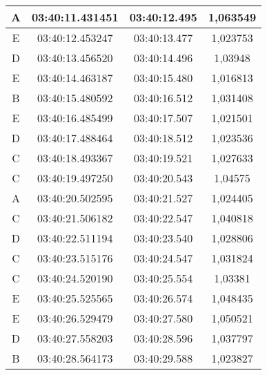 \begin{longtable}{|ccc|c|}
  \multicolumn{1}{|c|}{A}    & \multicolumn{1}{c|}{03:40:11.431451} & 03:40:12.495       & 1,063549   \\ \hline
  \multicolumn{1}{|c|}{E}    & \multicolumn{1}{c|}{03:40:12.453247} & 03:40:13.477       & 1,023753   \\ \hline
  \multicolumn{1}{|c|}{D}    & \multicolumn{1}{c|}{03:40:13.456520} & 03:40:14.496       & 1,03948    \\ \hline
  \multicolumn{1}{|c|}{E}    & \multicolumn{1}{c|}{03:40:14.463187} & 03:40:15.480       & 1,016813   \\ \hline
  \multicolumn{1}{|c|}{B}    & \multicolumn{1}{c|}{03:40:15.480592} & 03:40:16.512       & 1,031408   \\ \hline
  \multicolumn{1}{|c|}{E}    & \multicolumn{1}{c|}{03:40:16.485499} & 03:40:17.507       & 1,021501   \\ \hline
  \multicolumn{1}{|c|}{D}    & \multicolumn{1}{c|}{03:40:17.488464} & 03:40:18.512       & 1,023536   \\ \hline
  \multicolumn{1}{|c|}{C}    & \multicolumn{1}{c|}{03:40:18.493367} & 03:40:19.521       & 1,027633   \\ \hline
  \multicolumn{1}{|c|}{C}    & \multicolumn{1}{c|}{03:40:19.497250} & 03:40:20.543       & 1,04575    \\ \hline
  \multicolumn{1}{|c|}{A}    & \multicolumn{1}{c|}{03:40:20.502595} & 03:40:21.527       & 1,024405   \\ \hline
  \multicolumn{1}{|c|}{C}    & \multicolumn{1}{c|}{03:40:21.506182} & 03:40:22.547       & 1,040818   \\ \hline
  \multicolumn{1}{|c|}{D}    & \multicolumn{1}{c|}{03:40:22.511194} & 03:40:23.540       & 1,028806   \\ \hline
  \multicolumn{1}{|c|}{C}    & \multicolumn{1}{c|}{03:40:23.515176} & 03:40:24.547       & 1,031824   \\ \hline
  \multicolumn{1}{|c|}{C}    & \multicolumn{1}{c|}{03:40:24.520190} & 03:40:25.554       & 1,03381    \\ \hline
  \multicolumn{1}{|c|}{E}    & \multicolumn{1}{c|}{03:40:25.525565} & 03:40:26.574       & 1,048435   \\ \hline
  \multicolumn{1}{|c|}{E}    & \multicolumn{1}{c|}{03:40:26.529479} & 03:40:27.580       & 1,050521   \\ \hline
  \multicolumn{1}{|c|}{D}    & \multicolumn{1}{c|}{03:40:27.558203} & 03:40:28.596       & 1,037797   \\ \hline
  \multicolumn{1}{|c|}{B}    & \multicolumn{1}{c|}{03:40:28.564173} & 03:40:29.588       & 1,023827   \\ \hline

\end{longtable}
